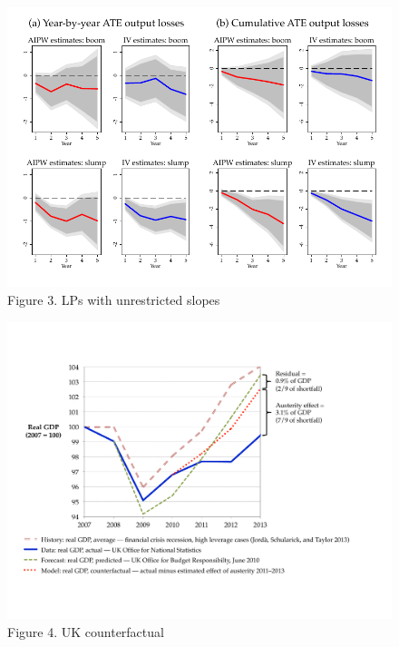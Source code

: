 \documentclass[12pt]{article}
\begin{document}
\begin{figure}[h]\centering
\caption{Figure 3. LPs with unrestricted slopes}
    \includegraphics{figure3.pdf}
\end{figure}

\begin{figure}[h]\centering
\caption{Figure 4. UK counterfactual}
    \includegraphics[width=\textwidth]{figure4.pdf}
\end{figure}
\end{document}

